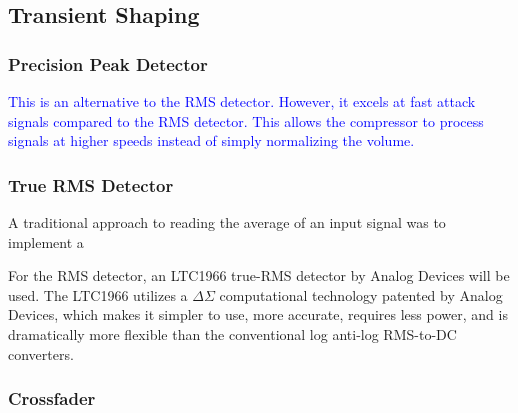 \documentclass[10pt]{article}
\begin{document}
\begin{multicols*}{2}
\begin{minipage}{\linewidth}
                                
                            \label{plot:tanh}
                        
                        \end{minipage}
            
            \subsection{Transient Shaping}

                \subsubsection{Precision Peak Detector}
                    \textcolor{blue}{This is an alternative to the RMS detector. However, it excels at fast attack signals compared to the RMS detector. This allows the compressor to process signals at higher speeds instead of simply normalizing the volume.}  

                \subsubsection{True RMS Detector}
                    A traditional approach to reading the average of an input signal was to implement a 
                    
                    For the RMS detector, an LTC1966 true-RMS detector by Analog Devices will be used. The LTC1966 utilizes a $\Delta\Sigma$ computational technology patented by Analog Devices, which makes it simpler to use, more accurate, requires less power, and is dramatically more flexible than the conventional log anti-log RMS-to-DC converters.                 
                    
                \subsubsection{Crossfader}


\end{multicols*}
\end{document}
